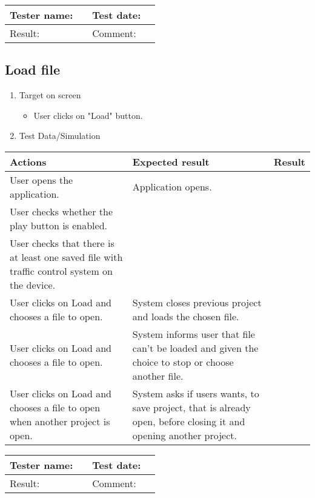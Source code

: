 \begin{tabularx}{\textwidth}{|p{3cm}X|p{3cm}X|}\hline
	Tester name: &  & Test date: & \\\hline
	Result: &  \pass & Comment: & \\\hline
\end{tabularx}



\subsection{Load file}

\begin{enumerate}
	
	\item Target on screen
	\begin{itemize}
		\item User clicks on "Load" button.
	\end{itemize}
	\item Test Data/Simulation
\end{enumerate}
	\begin{tabularx}{\textwidth}{|X|X|p{2.5cm}|}\hline
		Actions & Expected result & Result \\\hline
		User opens the application.& Application opens. &  \pass \\\hline
		User checks whether the play button is enabled. & &  \pass \\\hline
		User checks that there is at least one saved file with traffic control system on the device.& &\pass \\\hline
		User clicks on Load and chooses a file to open. & System closes previous project and loads the chosen file.  & \pass \\\hline 
		User clicks on Load and chooses a file to open. & System informs user that file can’t be loaded and given the choice
		to stop or choose another file. & \pass \\\hline 
		User clicks on Load and chooses a file to open when another project is open. & System asks if users wants, to save project, that is already open, before closing it and opening another project. & \pass \\\hline 
	\end{tabularx}

\begin{tabularx}{\textwidth}{|p{3cm}X|p{3cm}X|}\hline
	Tester name: &  & Test date: & \\\hline
	Result: &  \pass & Comment: & \\\hline
\end{tabularx}

